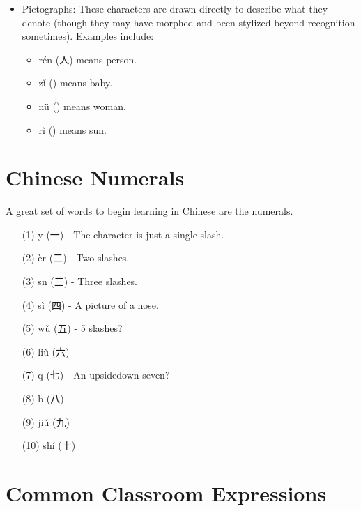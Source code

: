 \documentclass{article}
\begin{document}
\begin{itemize}
    \item Pictographs: These characters are drawn directly to describe what they denote (though they may have morphed and been stylized beyond recognition sometimes). Examples include:
    \begin{itemize}
        \item r\'{e}n (人) means person.
        \item z\v{i} () means baby.
        \item n\"{u} () means woman.
        \item r\`{i} () means sun.
    \end{itemize}
\end{itemize}

\section{Chinese Numerals}

A great set of words to begin learning in Chinese are the numerals.

\begin{itemize}
    \item[(1)] y (一) - The character is just a single slash.
    \item[(2)] \`{e}r (二) - Two slashes.
    \item[(3)] sn (三) - Three slashes.
    \item[(4)] s\`{i} (四) - A picture of a nose.
    \item[(5)] w\v{u} (五) - 5 slashes?
    \item[(6)] li\`{u} (六) - 
    \item[(7)] q (七) - An upsidedown seven?
    \item[(8)] b (八)
    \item[(9)] ji\v{u} (九)
    \item[(10)] sh\'{i} (十)
\end{itemize}

\section{Common Classroom Expressions}
\end{document}
